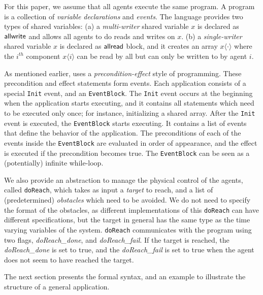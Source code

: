 For this paper, we assume that all agents execute the same \rolang program. A program is a collection of \emph{variable declarations} and \emph{events}. 
The language provides two types of shared variables:
(a) a {\em multi-writer} shared variable $x$ is declared as $\sf{allwrite}$ and allows all agents to do reads and writes on $x$. 
(b) a {\em single-writer\/} shared variable $x$ is declared as $\sf{allread}$ block, and it 
creates an array $x\langle \cdot \rangle$ 
where the $i^{th}$ component $x \langle i \rangle$ can be read by all but can only be written to by agent $i$.

As mentioned earlier, \rolang uses a \emph{precondition-effect} style of programming. These precondition and effect statements form events. Each application consists of a special \verb|Init| event, and an \verb|EventBlock|. The \verb|Init| event occurs at the beginning when the application starts executing, and it contains all statements which need to be executed only once; for instance, initializing a shared array. After the \verb|Init| event is executed, the \verb|EventBlock| starts executing. It contains a list of events that define the behavior of the application. The preconditions of each of the events inside the \verb|EventBlock| are evaluated in order of appearance, and the effect is executed if the precondition becomes true. The \verb|EventBlock| can be seen as a (potentially) infinite while-loop. 

We also provide an abstraction to manage the physical control of the agents, called \verb|doReach|, which takes as input a \emph{target} to reach, and a list of (predetermined) \emph{obstacles} which need to be avoided. We do not need to specify the format of the obstacles, as different implementations of this \verb|doReach| can have different specifications, but the target in general has the same type as the time varying variables of the system. \verb|doReach| communicates with the program using two flags, \emph{doReach_done}, and \emph{doReach_fail}. If the target is reached, the \emph{doReach_done} is set to true, and the \emph{doReach_fail} is set to true when the agent does not seem to have reached the target.

The next section presents the formal syntax, and an example to illustrate the structure of a general application. 

